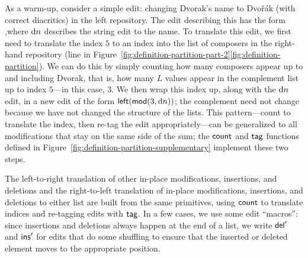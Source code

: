 As a warm-up, consider a simple edit: changing Dvorak's name to Dvo\v
r\'ak (with correct diacritics) in the left repository. The edit describing
this has the form \dissdis{},\dissdis where $\textrm{d} n$
describes the string edit to the
name. To translate this edit, we first need to 
translate the index $5$ to an index into the list of composers in the
right-hand repository (line  in
Figure~\ifdissertation\ref{fig:definition-partition-part-2}\else\ref{fig:definition-partition}\fi).  We can do this by simply counting
how many composers 
appear up to and including Dvorak, that is, how many $L$ values appear in the
complement list up to index $5$---in this case, $3$.  We then wrap this
index up, along with the $\textrm{d} n$ edit, in a new edit of the form
$\mathsf{left}(\mathsf{mod}(3,\textrm{d} n))$; the complement need not change because we
have not changed the structure of the lists. This pattern---count to
translate the index, then re-tag the edit appropriately---can be generalized
to all modifications that stay on the same side of the sum; the $\mathsf{count}$
and $\mathsf{tag}$ functions defined in
Figure~\ref{fig:definition-partition-supplementary} implement these two
steps.  

The left-to-right translation of other in-place modifications, insertions, and
deletions and the right-to-left translation of in-place modifications,
insertions, and deletions to either list are built from the same primitives, using
$\mathsf{count}$ to translate indices and re-tagging edits with $\mathsf{tag}$. 
%
In a few cases, we use some edit ``macros'': since insertions
and deletions always happen at the end of a list, we write $\mathsf{del}'$ and
$\mathsf{ins}'$ for edits that do some shuffling to ensure that the inserted or
deleted element moves to the appropriate position.

